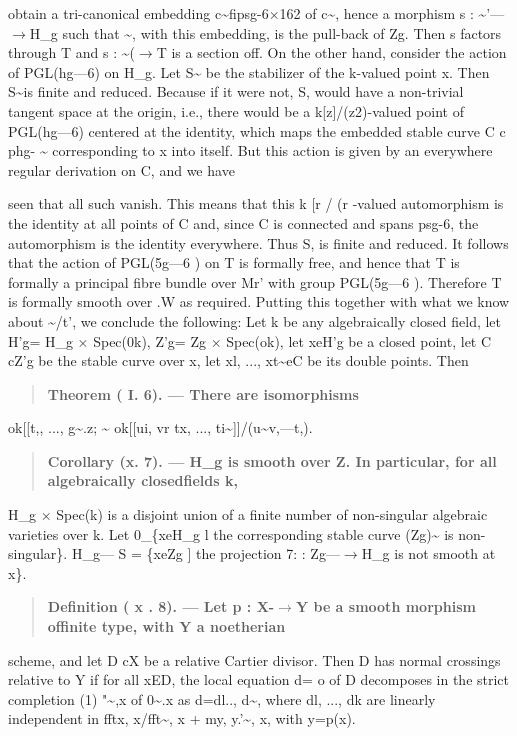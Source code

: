 \documentclass[11pt]{article}
\theoremstyle{plain}
\theoremstyle{definition}
\theoremstyle{remark}
\begin{document}
obtain a tri-canonical embedding c\textasciitilde{}fipsg-6$\times$162 of c\textasciitilde{}, hence a morphism s : \textasciitilde{}'---$\to$H\_g such that \textasciitilde{}, with this embedding, is the pull-back of Zg. Then s factors through T and s : \textasciitilde{}($\to$T is a section off. On the other hand, consider the action of PGL(hg---6) on H\_g. Let S\textasciitilde{} be the stabilizer of the k-valued point x. Then S\textasciitilde{}is finite and reduced. Because if it were not, S, would have a non-trivial tangent space at the origin, i.e., there would be a k[z]/(z2)-valued point of PGL(hg---6) centered at the identity, which maps the embedded stable curve C c phg- \textasciitilde{} corresponding to x into itself. But this action is given by an everywhere regular derivation on C, and we have

seen that all such vanish. This means that this k [r / (r -valued automorphism is the identity at all points of C and, since C is connected and spans psg-6, the automorphism is the identity everywhere. Thus S, is finite and reduced. It follows that the action of PGL(5g---6 ) on T is formally free, and hence that T is formally a principal fibre bundle over Mr' with group PGL(5g---6 ). Therefore T is formally smooth over .W as required. Putting this together with what we know about \textasciitilde{}/t', we conclude the following: Let k be any algebraically closed field, let H'g= H\_g $\times$ Spec(0k), Z'g= Zg $\times$ Spec(ok), let xeH'g be a closed point, let C cZ'g be the stable curve over x, let xl, ..., xt\textasciitilde{}eC be its double points. Then

\begin{quote}\textbf{Theorem ( I. 6). --- There are isomorphisms}\end{quote}
ok[[t,, ..., g\textasciitilde{}.z; \textasciitilde{} ok[[ui, vr tx, ..., ti\textasciitilde{}]]/(u\textasciitilde{}v,---t,).

\begin{quote}\textbf{Corollary (x. 7). --- H\_g is smooth over Z. In particular, for all algebraically closedfields k,}\end{quote}
H\_g $\times$ Spec(k) is a disjoint union of a finite number of non-singular algebraic varieties over k. Let 0\_\{xeH\_g l the corresponding stable curve (Zg)\textasciitilde{} is non-singular\}. H\_g--- S = \{xeZg ] the projection 7: : Zg---$\to$H\_g is not smooth at x\}.

\begin{quote}\textbf{Definition ( x . 8). --- Let p : X-$\to$Y be a smooth morphism offinite type, with Y a noetherian}\end{quote}
scheme, and let D cX be a relative Cartier divisor. Then D has normal crossings relative to Y if for all xED, the local equation d= o of D decomposes in the strict completion (1) "\textasciitilde{},x of 0\textasciitilde{}.x as d=dl.., d\textasciitilde{}, where dl, ..., dk are linearly independent in fftx, x/fft\textasciitilde{}, x + my, y.'\textasciitilde{}, x, with y=p(x).
\end{document}
